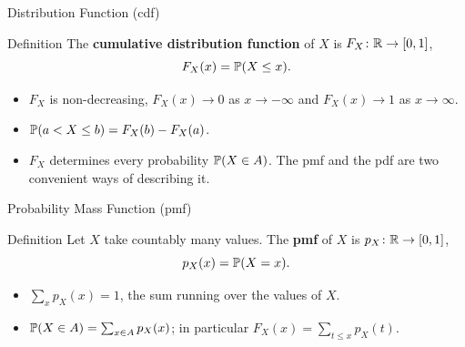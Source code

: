 \begin{frame}{Distribution Function (cdf)}
  \begin{block}{Definition}
    The \textbf{cumulative distribution function} of $X$ is $F_X\colon\mathbb{R}\to[0,1]$,
    \[
      F_X(x)=\mathbb{P}(X\le x).
    \]
  \end{block}
  \begin{itemize}
    \item $F_X$ is non-decreasing, $F_X(x)\to0$ as $x\to-\infty$ and $F_X(x)\to1$ as $x\to\infty$.
    \item $\mathbb{P}(a<X\le b)=F_X(b)-F_X(a)$.
    \item $F_X$ determines every probability $\mathbb{P}(X\in A)$. The pmf and the pdf are two convenient ways of describing it.
  \end{itemize}
\end{frame}

\begin{frame}{Probability Mass Function (pmf)}
  \begin{block}{Definition}
    Let $X$ take countably many values. The \textbf{pmf} of $X$ is $p_X\colon\mathbb{R}\to[0,1]$,
    \[
      p_X(x)=\mathbb{P}(X=x).
    \]
  \end{block}
  \begin{itemize}
    \item $\sum_x p_X(x)=1$, the sum running over the values of $X$.
    \item $\mathbb{P}(X\in A)=\sum_{x\in A}p_X(x)$; in particular $F_X(x)=\sum_{t\le x}p_X(t)$.
  \end{itemize}
\end{frame}

